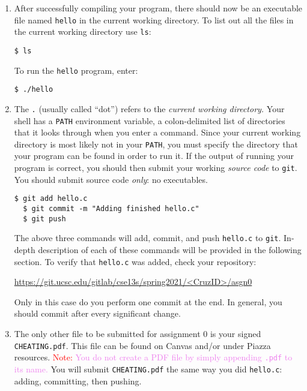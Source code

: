 \documentclass[11pt]{article}
\begin{document}
\begin{enumerate}
  \item After successfully compiling your program, there should now be an
    executable file named \texttt{hello} in the current working directory. To
    list out all the files in the current working directory use \texttt{ls}:

\begin{lstlisting}[style=bashstyle]
  $ ls
\end{lstlisting}

    To run the \texttt{hello} program, enter:

\begin{lstlisting}[style=bashstyle]
  $ ./hello
\end{lstlisting}

  \item The \texttt{.} (usually called ``dot'') refers to the \emph{current
    working directory.} Your shell has a \texttt{PATH} environment variable, a
    colon-delimited list of directories that it looks through when you enter a
    command. Since your current working directory is most likely not in your
    \texttt{PATH}, you must specify the directory that your program can be found
    in order to run it. If the output of running your program is correct, you
    should then submit your working \emph{source code} to \texttt{git}. You
    should submit source code \emph{only}: no executables.

\begin{lstlisting}[style=bashstyle]
  $ git add hello.c
  $ git commit -m "Adding finished hello.c"
  $ git push
\end{lstlisting}

    The above three commands will add, commit, and push \texttt{hello.c} to
    \texttt{git}. In-depth description of each of these commands will be
    provided in the following section. To verify that \texttt{hello.c} was
    added, check your repository:

    \centerline{\url{https://git.ucsc.edu/gitlab/cse13s/spring2021/<CruzID>/asgn0}}

    Only in this case do you perform one commit at the end. In general, you
    should commit after every significant change.

  \item The only other file to be submitted for assignment 0 is your signed
    \texttt{CHEATING.pdf}. This file can be found on Canvas and/or under Piazza
    resources. \textcolor{red}{Note:} \textcolor{violet}{You do not create a
    PDF file by simply appending \texttt{.pdf} to its name.} You will submit
    \texttt{CHEATING.pdf} the same way you did \texttt{hello.c}: adding,
    committing, then pushing.
\end{enumerate}
\end{document}
